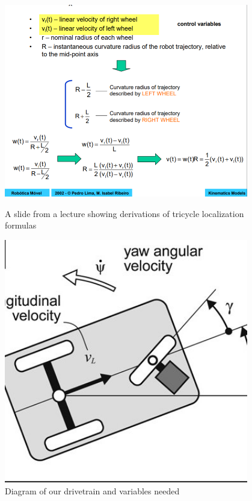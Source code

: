 \begin{figure}[ht]
\centering
\begin{minipage}[b]{.48\textwidth}
  \centering
  \includegraphics[width=0.95\textwidth]{Meetings/January/01-10-22/1.11.21 tricycle kinematics equations - James Hu.png}
  \caption{A slide from a lecture showing derivations of tricycle localization formulas}
  \label{fig:011022_1}
\end{minipage}%
\hfill%
\begin{minipage}[b]{.48\textwidth}
  \centering
  \includegraphics[width=0.95\textwidth]{Meetings/January/01-10-22/1.11.22 tricycle diagram - James Hu.jpg}
  \caption{Diagram of our drivetrain and variables needed}
  \label{fig:011022_2}
\end{minipage}
\end{figure}

